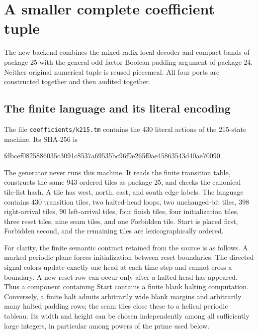 \section{A smaller complete coefficient tuple}
\label{sec:coefficients}

The new backend combines the mixed-radix local decoder and compact bands
of package 25 with the general odd-factor Boolean padding argument of
package 24. Neither original numerical tuple is reused piecemeal.
All four ports are constructed together and then audited together.

\subsection{The finite language and its literal encoding}

The file \texttt{coefficients/k215.tm} contains the 430 literal actions
of the 215-state machine. Its SHA-256 is
\begin{center}\scriptsize\ttfamily
fdbcef0825886035c3091c8537a69535bc96f9e265f0ae45863543d40ae70090.
\end{center}
The generator never runs this machine. It reads the finite transition
table, constructs the same 943 ordered tiles as package 25, and checks
the canonical tile-list hash. A tile has west, north, east, and south
edge labels. The language contains 430 transition tiles, two halted-head
loops, two unchanged-bit tiles, 398 right-arrival tiles, 90 left-arrival
tiles, four finish tiles, four initialization tiles, three reset tiles,
nine seam tiles, and one Forbidden tile. Start is placed first,
Forbidden second, and the remaining tiles are lexicographically ordered.

For clarity, the finite semantic contract retained from the source is as
follows. A marked periodic plane forces initialization between reset
boundaries. The directed signal colors update exactly one head at each
time step and cannot cross a boundary. A new reset row can occur only
after a halted head has appeared. Thus a component containing Start
contains a finite blank halting computation. Conversely, a finite halt
admits arbitrarily wide blank margins and arbitrarily many halted padding
rows; the seam tiles close these to a helical periodic tableau. Its width
and height can be chosen independently among all sufficiently large
integers, in particular among powers of the prime used below.


